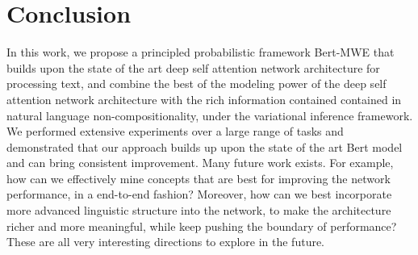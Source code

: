 \documentclass[conference]{IEEEtran}
\newcommand{\BertMWE}{\mbox{\sf Bert-MWE}\xspace}
\begin{document}
\section{Conclusion}\label{sec:bert_mwe_conclusion}
In this work, 
we propose a principled probabilistic framework \BertMWE that builds upon the state of the art 
deep self attention network architecture for processing text, 
and combine the best of the modeling power of the deep self attention network architecture with the rich information contained contained in natural language non-compositionality, 
under the variational inference framework. 
We performed extensive experiments over a large range of tasks and demonstrated that our approach builds up upon the state of the art Bert model and can bring consistent improvement.
Many future work exists. For example, how can we effectively mine concepts that are best for improving the network performance, in a end-to-end fashion? Moreover, how can we best incorporate more advanced linguistic structure into the network, to make the architecture richer and more meaningful, while keep pushing the boundary of performance? These are all very interesting directions to explore in the future.




\balance



\end{document}
